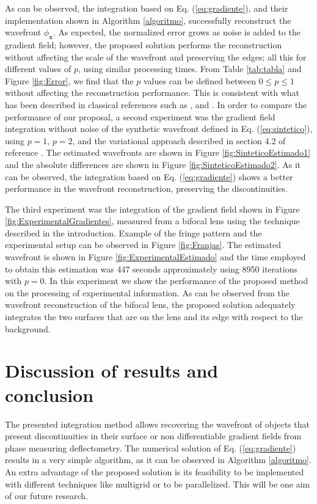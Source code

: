 \documentclass[12pt,letterpaper]{article}
\begin{document}
As can be observed, the integration based on Eq. (\ref{eq:gradiente}), and their implementation shown in Algorithm \ref{algoritmo}, successfully reconstruct the wavefront $\phi_{\mathbf{x}}.$ As expected, the normalized error grows as noise is added to the gradient field; however, the proposed solution performs the reconstruction without affecting the scale of the wavefront and preserving the edges; all this for different values of $p$, using similar processing times. From Table \ref{tab:tabla} and Figure \ref{fig:Error}, we find that the $p$ values can be defined between $0 \le p \le 1$ without affecting the reconstruction performance. This is consistent with what has been described in classical references such as ,  and . In order to compare the performance of our proposal, a second experiment was the gradient field integration without noise of the synthetic wavefront defined in Eq. (\ref{eq:sintetico}), using $p = 1$, $p = 2$, and the variational approach described in section 4.2 of reference . The estimated wavefronts are shown in Figure \ref{fig:SinteticoEstimado1} and the absolute differences are shown in Figure \ref{fig:SinteticoEstimado2}. As it can be observed, the integration based on Eq. (\ref{eq:gradiente}) shows a better performance in the wavefront reconstruction, preserving the discontinuities.

The third experiment was the integration of the gradient field shown in Figure \ref{fig:ExperimentalGradientes}, measured from a bifocal lens using the technique described in the introduction. Example of the fringe pattern and the experimental setup can be observed in Figure \ref{fig:Franjas}. The estimated wavefront is shown in Figure \ref{fig:ExperimentalEstimado} and the time employed to obtain this estimation was 447 seconds approximately using 8950 iterations with $p = 0$. In this experiment we show the performance of the proposed method on the processing of experimental information. As can be observed from the wavefront reconstruction of the bifocal lens, the proposed solution adequately integrates the two surfaces that are on the lens and its edge with respect to the background.



\section{Discussion of results and conclusion}\label{sec:conclusion}
The presented integration method allows recovering the wavefront of objects that present discontinuities in their surface or non differentiable gradient fields from phase measuring deflectometry. The numerical solution of Eq. (\ref{eq:gradiente}) results in a very simple algorithm, as it can be observed in Algorithm \ref{algoritmo}. An extra advantage of the proposed solution is its feasibility to be implemented with different techniques like multigrid or to be parallelized. This will be one aim of our future research.
\end{document}
